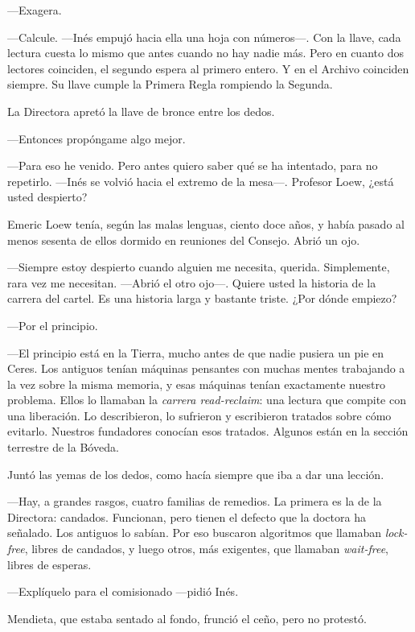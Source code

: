 ---Exagera.

---Calcule. ---Inés empujó hacia ella una hoja con números---\nobreak. Con la llave, cada lectura cuesta lo mismo que antes cuando no hay nadie más. Pero en cuanto dos lectores coinciden, el segundo espera al primero entero. Y en el Archivo coinciden siempre. Su llave cumple la Primera Regla rompiendo la Segunda.

La Directora apretó la llave de bronce entre los dedos.

---Entonces propóngame algo mejor.

---Para eso he venido. Pero antes quiero saber qué se ha intentado, para no repetirlo. ---Inés se volvió hacia el extremo de la mesa---\nobreak. Profesor Loew, ¿está usted despierto?

\escena
Emeric Loew tenía, según las malas lenguas, ciento doce años, y había pasado al menos sesenta de ellos dormido en reuniones del Consejo. Abrió un ojo.

---Siempre estoy despierto cuando alguien me necesita, querida. Simplemente, rara vez me necesitan. ---Abrió el otro ojo---\nobreak. Quiere usted la historia de la carrera del cartel. Es una historia larga y bastante triste. ¿Por dónde empiezo?

---Por el principio.

---El principio está en la Tierra, mucho antes de que nadie pusiera un pie en Ceres. Los antiguos tenían máquinas pensantes con muchas mentes trabajando a la vez sobre la misma memoria, y esas máquinas tenían exactamente nuestro problema. Ellos lo llamaban la \emph{carrera read-reclaim}: una lectura que compite con una liberación. Lo describieron, lo sufrieron y escribieron tratados sobre cómo evitarlo. Nuestros fundadores conocían esos tratados. Algunos están en la sección terrestre de la Bóveda.

Juntó las yemas de los dedos, como hacía siempre que iba a dar una lección.

---Hay, a grandes rasgos, cuatro familias de remedios. La primera es la de la Directora: candados. Funcionan, pero tienen el defecto que la doctora ha señalado. Los antiguos lo sabían. Por eso buscaron algoritmos que llamaban \emph{lock-free}, libres de candados, y luego otros, más exigentes, que llamaban \emph{wait-free}, libres de esperas.

---Explíquelo para el comisionado ---pidió Inés.

Mendieta, que estaba sentado al fondo, frunció el ceño, pero no protestó.

